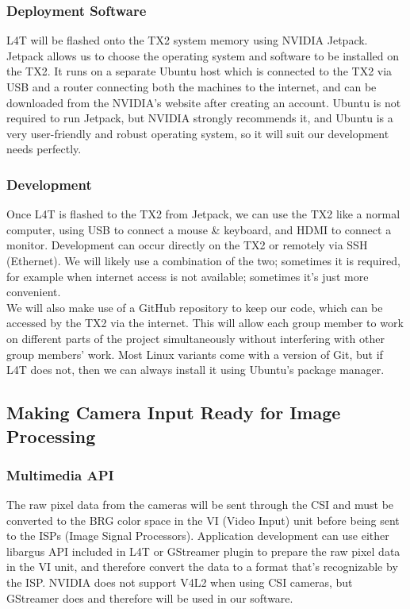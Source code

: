 \documentclass[letterpaper,10pt,serif,draftclsnofoot,onecolumn,compsoc,titlepage]{IEEEtran}
\begin{document}
\subsubsection{Deployment Software}
L4T will be flashed onto the TX2 system memory using NVIDIA Jetpack. Jetpack allows us to choose the operating system and software to be installed on the TX2. It runs on a separate Ubuntu host which is connected to the TX2 via USB and a router connecting both the machines to the internet, and can be downloaded from the NVIDIA’s website after creating an account. Ubuntu is not required to run Jetpack, but NVIDIA strongly recommends it, and Ubuntu is a very user-friendly and robust operating system, so it will suit our development needs perfectly.

\subsubsection{Development}
Once L4T is flashed to the TX2 from Jetpack, we can use the TX2 like a normal computer, using USB to connect a mouse \& keyboard, and HDMI to connect a monitor. Development can occur directly on the TX2 or remotely via SSH (Ethernet). We will likely use a combination of the two; sometimes it is required, for example when internet access is not available; sometimes it’s just more convenient. \\

We will also make use of a GitHub repository to keep our code, which can be accessed by the TX2 via the internet. This will allow each group member to work on different parts of the project simultaneously without interfering with other group members’ work. Most Linux variants come with a version of Git, but if L4T does not, then we can always install it using Ubuntu’s package manager. \\

\subsection{Making Camera Input Ready for Image Processing}

\subsubsection{Multimedia API}

The raw pixel data from the cameras will be sent through the CSI and must be converted 
to the BRG color space in the VI (Video Input) unit before being sent to the ISPs 
(Image Signal Processors). Application development can use either libargus API 
included in L4T or GStreamer plugin to prepare the raw pixel data in the VI unit, and 
therefore convert the data to a format that’s recognizable by the ISP. NVIDIA does not 
support V4L2 when using CSI cameras, but GStreamer does and therefore will be used in 
our software.  \\
\end{document}
